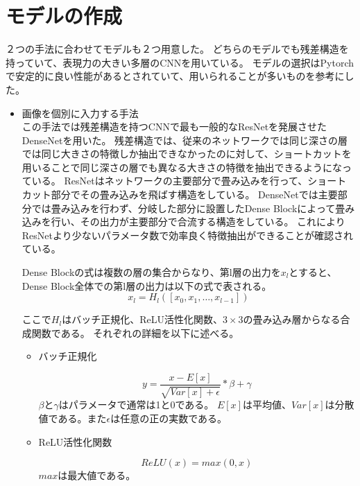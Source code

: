 \section{モデルの作成}
２つの手法に合わせてモデルも２つ用意した。
どちらのモデルでも残差構造を持っていて、表現力の大きい多層のCNNを用いている。
モデルの選択はPytorchで安定的に良い性能があるとされていて、用いられることが多いものを参考にした。
\begin{itemize}
    \item 画像を個別に入力する手法\\
この手法では残差構造を持つCNN\cite{CNN}で最も一般的なResNet\cite{ResNet}を発展させたDenseNet\cite{DenseNet}を用いた。
残差構造では、従来のネットワークでは同じ深さの層では同じ大きさの特徴しか抽出できなかったのに対して、ショートカットを用いることで同じ深さの層でも異なる大きさの特徴を抽出できるようになっている。
ResNet\cite{ResNet}はネットワークの主要部分で畳み込みを行って、ショートカット部分でその畳み込みを飛ばす構造をしている。
DenseNet\cite{DenseNet}では主要部分では畳み込みを行わず、分岐した部分に設置したDense Blockによって畳み込みを行い、その出力が主要部分で合流する構造をしている。
これによりResNet\cite{ResNet}より少ないパラメータ数で効率良く特徴抽出ができることが確認されている。

Dense Blockの式は複数の層の集合からなり、第l層の出力を\mbox{\boldmath $x_l$}とすると、Dense Block全体での第l層の出力は以下の式で表される。
\begin{equation}
    x_l = H_l([x_0, x_1, … , x_{l-1}])
\end{equation}

ここで$H_l$はバッチ正規化、ReLU活性化関数、$3 \times 3$の畳み込み層からなる合成関数である。
それぞれの詳細を以下に述べる。

\begin{itemize}
    \item バッチ正規化

    \begin{equation}
         y = \frac{x - E[x]}{\sqrt{Var[x] + \epsilon}} * \beta + \gamma
    \end{equation}
    $\beta$と$\gamma$はパラメータで通常は1と0である。
    $E[x]$は平均値、$Var[x]$は分散値である。また$\epsilon$は任意の正の実数である。

    \item ReLU活性化関数

    \begin{equation}
         ReLU(x) = max(0, x)
    \end{equation}
    $max$は最大値である。


\end{itemize}
\end{itemize}

